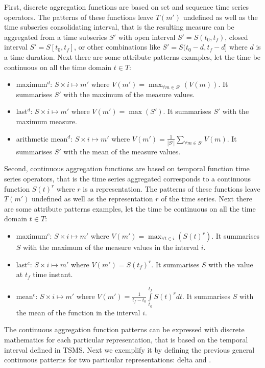 First, discrete aggregation functions are based on set and sequence
time series operators. The patterns of these functions leave $T(m')$
undefined as well as the time subseries consolidating interval, that
is the resulting measure can be aggregated from a time subseries $S'$
with open interval $S'=S(t_0,t_f)$, closed interval $S'=S[t_0,t_f]$,
or other combinations like $S'=S(t_0-d,t_f-d]$ where $d$ is a time
duration. Next there are some attribute patterns examples, let the
time be continuous on all the time domain $t\in T$:
\begin{itemize}
\item maximum$^d$: $S \times i \mapsto m'$ where $V(m') =
  \max_{\forall m \in S'}(V(m))$. It summarises $S'$ with the maximum
  of the measure values.
\item last$^d$: $S \times i \mapsto m'$ where $V(m') = \max(S')$. It
  summarises $S'$ with the maximum measure.
\item arithmetic mean$^d$: $S \times i \mapsto m'$ where $V(m') =
  \frac{1}{|S'|} \sum\limits_{\forall m\in S'} V(m)$. It
  summarises $S'$ with the mean of the measure values.
\end{itemize}


Second, continuous aggregation functions are based on temporal
function time series operators, that is the time series aggregated
corresponds to a continuous function $S(t)^r$ where $r$ is a
representation. The patterns of these functions leave $T(m')$
undefined as well as the representation $r$ of the time series.  Next
there are some attribute patterns examples, let the time be continuous
on all the time domain $t\in T$:

\begin{itemize}
\item maximum$^c$: $S \times i \mapsto m'$ where $V(m') =
  \max_{\forall t \in i}(S(t)^r)$. It summarises $S$ with the maximum
  of the measure values in the interval $i$.
\item last$^c$: $S \times i \mapsto m'$ where $V(m') = S(t_f)^r$. It
  summarises $S$ with the value at $t_f$ time instant.
\item mean$^c$: $S \times i \mapsto m'$ where $V(m') =
  \frac{1}{t_f-t_0} \int\limits_{t_0}^{t_f} S(t)^r dt$. It summarises $S$
  with the mean of the function in the interval $i$.
\end{itemize}


The continuous aggregation function patterns can be expressed with
discrete mathematics for each particular representation, that is based
on the temporal interval defined in TSMS. Next we exemplify it by
defining the previous general continuous patterns for two particular
representations: delta and \zohe{}.



